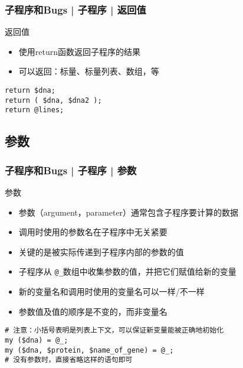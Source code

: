 \begin{frame}[fragile]
  \frametitle{子程序和Bugs | 子程序 | \alert{返回值}}
  \begin{block}{返回值}
    \begin{itemize}
      \item 使用return函数返回子程序的结果
      \item 可以返回：标量、标量列表、数组，等
    \end{itemize}
  \end{block}
\begin{lstlisting}
return $dna;
return ( $dna, $dna2 );
return @lines;
\end{lstlisting}
\end{frame}

\subsection{参数}
\begin{frame}[fragile]
  \frametitle{子程序和Bugs | 子程序 | \alert{参数}}
  \begin{block}{参数}
    \begin{itemize}
      \item 参数（argument，parameter）通常包含子程序要计算的数据
      \item 调用时使用的参数名在子程序中无关紧要
      \item 关键的是被实际传递到子程序内部的参数的值
      \item 子程序从 \verb|@_|数组中收集参数的值，并把它们赋值给新的变量
      \item 新的变量名和调用时使用的变量名可以一样/不一样
      \item 参数值及值的顺序是不变的，而非变量名
    \end{itemize}
  \end{block}
\begin{lstlisting}
# 注意：小括号表明是列表上下文，可以保证新变量能被正确地初始化
my ($dna) = @_;
my ($dna, $protein, $name_of_gene) = @_;
# 没有参数时，直接省略这样的语句即可
\end{lstlisting}
\end{frame}

